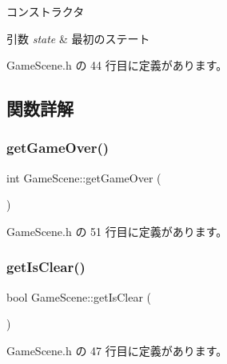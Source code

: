 コンストラクタ 


\begin{DoxyParams}{引数}
{\em state} & 最初のステート \\
\hline
\end{DoxyParams}


 Game\+Scene.\+h の 44 行目に定義があります。



\subsection{関数詳解}
\mbox{\label{class_game_scene_a2f8413f473bc9a937fa02bfd4678d61d}} 
\subsubsection{\texorpdfstring{get\+Game\+Over()}{getGameOver()}}
{\footnotesize\ttfamily int Game\+Scene\+::get\+Game\+Over (\begin{DoxyParamCaption}{ }\end{DoxyParamCaption})\hspace{0.3cm}{\ttfamily [inline]}}



 Game\+Scene.\+h の 51 行目に定義があります。

\mbox{\label{class_game_scene_a56604f01c0fa914660c3d8b788a94405}} 
\subsubsection{\texorpdfstring{get\+Is\+Clear()}{getIsClear()}}
{\footnotesize\ttfamily bool Game\+Scene\+::get\+Is\+Clear (\begin{DoxyParamCaption}{ }\end{DoxyParamCaption})\hspace{0.3cm}{\ttfamily [inline]}}



 Game\+Scene.\+h の 47 行目に定義があります。

\mbox{\label{class_game_scene_a16b26b3b8ea91dcaf762292414bf5d6d}} 
